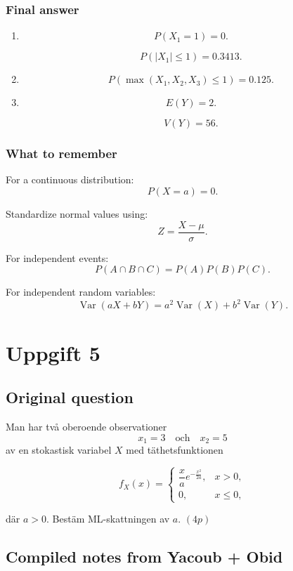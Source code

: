 \documentclass[10pt]{article}
\begin{document}
\subsubsection*{Final answer}

\begin{enumerate}[label=\alph*)]
\item
\[
P(X_1=1)=0.
\]

\[
P(|X_1|\le 1)=0.3413.
\]

\item
\[
P(\max(X_1,X_2,X_3)\le 1)
=0.125.
\]

\item
\[
E(Y)=2.
\]

\[
V(Y)=56.
\]
\end{enumerate}

\subsubsection*{What to remember}

For a continuous distribution:
\[
P(X=a)=0.
\]

Standardize normal values using:
\[
Z=\frac{X-\mu}{\sigma}.
\]

For independent events:
\[
P(A\cap B\cap C)=P(A)P(B)P(C).
\]

For independent random variables:
\[
\operatorname{Var}(aX+bY)
=
a^2\operatorname{Var}(X)
+
b^2\operatorname{Var}(Y).
\]

\section*{Uppgift 5}

\subsection*{Original question}

Man har två oberoende observationer
\[
x_1=3
\quad\text{och}\quad
x_2=5
\]
av en stokastisk variabel \(X\) med täthetsfunktionen

\[
f_X(x)=
\begin{cases}
\dfrac{x}{a}
e^{-\frac{x^2}{2a}},
& x>0,\\
0,
& x\le 0,
\end{cases}
\]

där \(a>0\). Bestäm ML-skattningen av \(a\).
\((4p)\)

\subsection*{Compiled notes from Yacoub + Obid}
\end{document}

